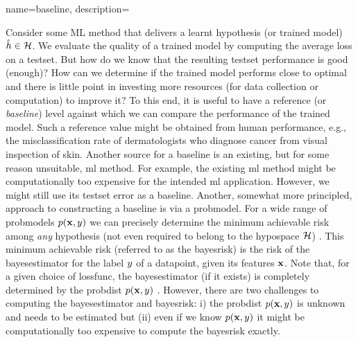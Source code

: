 {name={baseline},
    description={Consider some ML method that delivers a learnt \gls{hypothesis} (or trained \gls{model}) 
    $\hat{h} \in \mathcal{H}$. We evaluate the quality of a trained \gls{model} 
    by computing the average \gls{loss} on a \gls{testset}. But how do we know that the resulting 
    \gls{testset} performance is good (enough)? How can we determine if the trained \gls{model} performs 
    close to optimal and there is little point in investing more resources (for \gls{data} collection 
	or computation) to improve it? To this end, it is useful to have a reference (or \emph{baseline}) 
	level against which we can compare the performance of the trained \gls{model}. 
    Such a reference value might be obtained from human performance, e.g., the misclassification
    rate of dermatologists who diagnose cancer from visual inspection of skin. Another 
    source for a baseline is an existing, but for some reason unsuitable, \gls{ml} method. 
    For example, the existing  \gls{ml} method might be computationally too expensive for 
    the intended \gls{ml} application. However, we might still use its \gls{testset} error 
    as a baseline. Another, somewhat more principled, approach to constructing a 
    baseline is via a \gls{probmodel}. For a wide range of \gls{probmodel}s $p({\bf x},y)$ 
    we can precisely determine the minimum achievable \gls{risk} among \emph{any} \gls{hypothesis} (not even 
    required to belong to the \gls{hypospace} $\mathcal{H}$) \cite{LC}. 
    This minimum achievable \gls{risk} (referred to as the \gls{bayesrisk}) is the \gls{risk} 
    of the \gls{bayesestimator} for the \gls{label} $y$ of a \gls{datapoint}, given
    its \gls{feature}s ${\bf x}$. Note that, for a given choice of \gls{lossfunc}, the 
    \gls{bayesestimator} (if it exists) is completely determined by the \gls{probdist} $p({\bf x},y)$ \cite[Chapter 4]{LC}. 
    However, there are two challenges to computing the \gls{bayesestimator} and \gls{bayesrisk}:
    i) the \gls{probdist} $p({\bf x},y)$ is unknown and needs to be estimated 
    but (ii) even if we know $p({\bf x},y)$ it might be computationally too expensive  
	to compute the \gls{bayesrisk} exactly. 
	\begin{figure}[h]
		\begin{center}
\end{center}
\end{figure}}}
